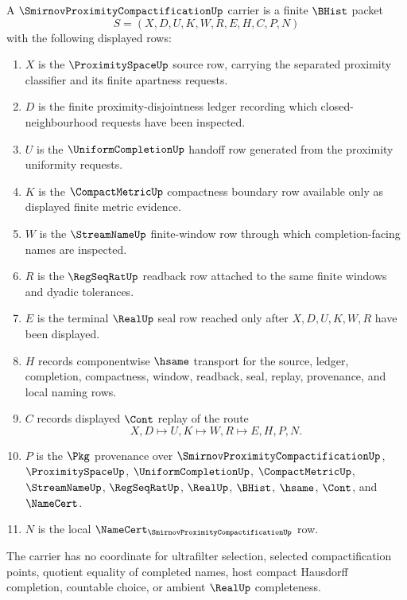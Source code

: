 \begin{definition}
\label{def:smirnov-proximity-compactification-carrier}
A $\SmirnovProximityCompactificationUp$ carrier is a finite $\BHist$ packet
$$
S=(X,D,U,K,W,R,E,H,C,P,N)
$$
with the following displayed rows:
\begin{enumerate}
\item $X$ is the $\ProximitySpaceUp$ source row, carrying the separated proximity classifier and its finite apartness requests.
\item $D$ is the finite proximity-disjointness ledger recording which closed-neighbourhood requests have been inspected.
\item $U$ is the $\UniformCompletionUp$ handoff row generated from the proximity uniformity requests.
\item $K$ is the $\CompactMetricUp$ compactness boundary row available only as displayed finite metric evidence.
\item $W$ is the $\StreamNameUp$ finite-window row through which completion-facing names are inspected.
\item $R$ is the $\RegSeqRatUp$ readback row attached to the same finite windows and dyadic tolerances.
\item $E$ is the terminal $\RealUp$ seal row reached only after $X,D,U,K,W,R$ have been displayed.
\item $H$ records componentwise $\hsame$ transport for the source, ledger, completion, compactness, window, readback, seal, replay, provenance, and local naming rows.
\item $C$ records displayed $\Cont$ replay of the route
$$
X,D \longmapsto U,K \longmapsto W,R \longmapsto E,H,P,N .
$$
\item $P$ is the $\Pkg$ provenance over $\SmirnovProximityCompactificationUp$, $\ProximitySpaceUp$, $\UniformCompletionUp$, $\CompactMetricUp$, $\StreamNameUp$, $\RegSeqRatUp$, $\RealUp$, $\BHist$, $\hsame$, $\Cont$, and $\NameCert$.
\item $N$ is the local $\NameCert_{\SmirnovProximityCompactificationUp}$ row.
\end{enumerate}
The carrier has no coordinate for ultrafilter selection, selected compactification points, quotient equality of completed names, host compact Hausdorff completion, countable choice, or ambient $\RealUp$ completeness.
\end{definition}

